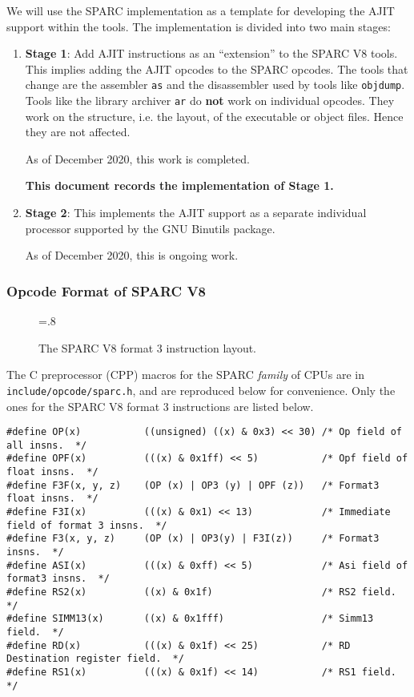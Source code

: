 We will use the SPARC implementation as a template for developing the
AJIT support within the tools.  The implementation is divided into two
main stages:
\begin{enumerate}
\item \label{stage:1}  \textbf{Stage 1}:  Add AJIT instructions  as an
  ``extension'' to the  SPARC V8 tools.  This implies  adding the AJIT
  opcodes  to  the SPARC  opcodes.   The  tools  that change  are  the
  assembler  \texttt{as}  and  the  disassembler used  by  tools  like
  \texttt{objdump}.  Tools  like the  library archiver  \texttt{ar} do
  \textbf{not}  work   on  individual  opcodes.   They   work  on  the
  structure,  i.e. the  layout,  of the  executable  or object  files.
  Hence they are not affected.

  As of December 2020, this work is completed.
  
  \textbf{This document records the implementation of Stage 1.}

\item  \label{stage:2}  \textbf{Stage  2}: This  implements  the  AJIT
  support  as a  separate individual  processor supported  by the  GNU
  Binutils package.

  As of December 2020, this is ongoing work.
\end{enumerate}

\subsubsection{Opcode Format of SPARC V8}
\label{sec:sparc:v8:opcode:format}

\begin{figure}[h]
  \centering
  \epsfxsize=.8\linewidth
  \caption[Format 3 SPARC V8 Layout.]{The SPARC V8 format 3
    instruction layout.}
  \label{fig:f3:layout}
\end{figure}

The C  preprocessor (CPP) macros  for the SPARC \emph{family}  of CPUs
are in  \texttt{include/opcode/sparc.h}, and are reproduced  below for
convenience.  Only the ones for the SPARC V8 format 3 instructions are
listed below.
{\small
\begin{verbatim}
#define OP(x)           ((unsigned) ((x) & 0x3) << 30) /* Op field of all insns.  */
#define OPF(x)          (((x) & 0x1ff) << 5)           /* Opf field of float insns.  */
#define F3F(x, y, z)    (OP (x) | OP3 (y) | OPF (z))   /* Format3 float insns.  */
#define F3I(x)          (((x) & 0x1) << 13)            /* Immediate field of format 3 insns.  */
#define F3(x, y, z)     (OP (x) | OP3(y) | F3I(z))     /* Format3 insns.  */
#define ASI(x)          (((x) & 0xff) << 5)            /* Asi field of format3 insns.  */
#define RS2(x)          ((x) & 0x1f)                   /* RS2 field.  */
#define SIMM13(x)       ((x) & 0x1fff)                 /* Simm13 field.  */
#define RD(x)           (((x) & 0x1f) << 25)           /* RD Destination register field.  */
#define RS1(x)          (((x) & 0x1f) << 14)           /* RS1 field.  */
\end{verbatim}
}

